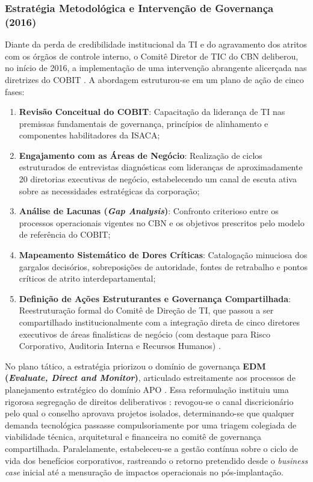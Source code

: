 \subsubsection{Estratégia Metodológica e Intervenção de Governança (2016)}

Diante da perda de credibilidade institucional da TI e do agravamento dos atritos com os órgãos de controle interno, o Comitê Diretor de TIC do CBN deliberou, no início de 2016, a implementação de uma intervenção abrangente alicerçada nas diretrizes do COBIT \cite{teitler2022case}. A abordagem estruturou-se em um plano de ação de cinco fases:

\begin{enumerate}
    \item \textbf{Revisão Conceitual do COBIT}: Capacitação da liderança de TI nas premissas fundamentais de governança, princípios de alinhamento e componentes habilitadores da ISACA;
    \item \textbf{Engajamento com as Áreas de Negócio}: Realização de ciclos estruturados de entrevistas diagnósticas com lideranças de aproximadamente 20 diretorias executivas de negócio, estabelecendo um canal de escuta ativa sobre as necessidades estratégicas da corporação;
    \item \textbf{Análise de Lacunas (\textit{Gap Analysis})}: Confronto criterioso entre os processos operacionais vigentes no CBN e os objetivos prescritos pelo modelo de referência do COBIT;
    \item \textbf{Mapeamento Sistemático de Dores Críticas}: Catalogação minuciosa dos gargalos decisórios, sobreposições de autoridade, fontes de retrabalho e pontos críticos de atrito interdepartamental;
    \item \textbf{Definição de Ações Estruturantes e Governança Compartilhada}: Reestruturação formal do Comitê de Direção de TI, que passou a ser compartilhado institucionalmente com a integração direta de cinco diretores executivos de áreas finalísticas de negócio (com destaque para Risco Corporativo, Auditoria Interna e Recursos Humanos) \cite{teitler2022case}.
\end{enumerate}

No plano tático, a estratégia priorizou o domínio de governança \textbf{EDM (\textit{Evaluate, Direct and Monitor})}, articulado estreitamente aos processos de planejamento estratégico do domínio APO \cite{teitler2022case}. Essa reformulação instituiu uma rigorosa segregação de direitos deliberativos \cite{weill2004governance}: revogou-se o canal discricionário pelo qual o conselho aprovava projetos isolados, determinando-se que qualquer demanda tecnológica passasse compulsoriamente por uma triagem colegiada de viabilidade técnica, arquitetural e financeira no comitê de governança compartilhada. Paralelamente, estabeleceu-se a gestão contínua sobre o ciclo de vida dos benefícios corporativos, rastreando o retorno pretendido desde o \textit{business case} inicial até a mensuração de impactos operacionais no pós-implantação.

